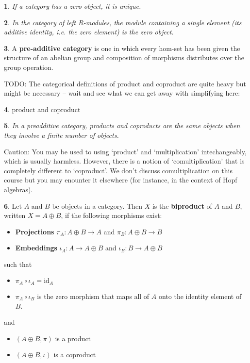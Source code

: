 \documentclass[oneside,english]{amsbook}
\numberwithin{section}{chapter}
\theoremstyle{plain}
\newtheorem{thm}{\protect\theoremname}
\theoremstyle{definition}
\newtheorem{defn}[thm]{\protect\definitionname}
\providecommand{\definitionname}{Definition}
\providecommand{\theoremname}{Theorem}
\begin{document}
			\begin{thm}
				If a category has a zero object, it is unique.
			\end{thm}
			
			\begin{thm}
				In the category of left $R$-modules, the module containing a single element (its additive identity, i.e. the zero element) is the zero object.
			\end{thm}

			\begin{defn}
				A \textbf{pre-additive category} is one in which every hom-set has been given the structure of an abelian group and composition of morphisms distributes over the group operation.				
			\end{defn}
			
			TODO: The categorical definitions of product and coproduct are quite heavy but might be necessary -- wait and see what we can get away with simplifying here:
			
			\begin{defn}
				product and coproduct
			\end{defn}
			
			\begin{thm}
				In a preadditive category, products and coproducts are the same objects when they involve a finite number of objects.
			\end{thm}
			
			Caution: You may be used to using `product' and `multiplication' intechangeably, which is usually harmless. However, there is a notion of `comultiplication' that is completely different to `coproduct'. We don't discuss comultiplication on this course but you may enounter it elsewhere (for instance, in the context of Hopf algebras).
			
			\begin{defn}
				Let $A$ and $B$ be objects in a category. Then $X$ is the \textbf{biproduct} of $A$ and $B$, written $X = A\oplus B$, if the following morphisms exist:
				\begin{itemize}
					\item \textbf{Projections} $\pi_A: A\oplus B\to A$ and $\pi_B: A\oplus B\to B$ 
					\item \textbf{Embeddings} $\iota_A: A\to A\oplus B$ and $\iota_B: B\to A\oplus B$ 
				\end{itemize}
				such that
				\begin{itemize}
					\item $\pi_A\circ\iota_A = \text{id}_A$
					\item $\pi_A\circ\iota_B$ is the zero morphism that maps all of $A$ onto the identity element of $B$.
				\end{itemize}
				and
				\begin{itemize}
					\item $(A\oplus B, \pi)$ is a product
					\item $(A\oplus B, \iota)$ is a coproduct
				\end{itemize}
			\end{defn}
			
\end{document}
